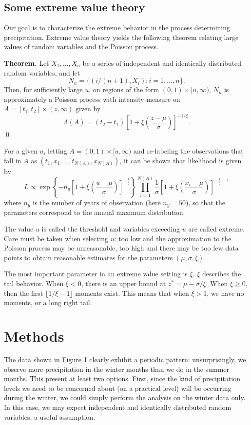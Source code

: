 \documentclass[12pt]{article}
\begin{document}
\subsection*{Some extreme value theory}

\noindent Our goal is to characterize the extreme behavior in the process determining precipitation. Extreme value theory yields the following theorem relating large values of random variables and the Poisson process.
\bigskip

\noindent \textbf{Theorem.} Let $X_1,\ldots,X_n$ be a series of independent and identically distributed random variables, and let
\[ N_n = \{(i/(n+1), X_i):i=1,\ldots,n\}. \]
\noindent Then, for sufficiently large $u$, on regions of the form $(0,1)\times[u,\infty)$, $N_n$ is approximately a Poisson process with intensity measure on $A=[t_1,t_2]\times(z,\infty)$ given by
\[ \Lambda(A) = (t_2-t_1)\left[1+\xi\left(\frac{z-\mu}{\sigma}\right)\right]^{-1/\xi}. \]
\qed
\bigskip

\noindent For a given $u$, letting $A=(0,1)\times[u,\infty)$ and re-labeling the observations that fall in $A$ as $(t_1,x_1,\ldots,t_{N(A)},x_{N(A)})$, it can be shown that likelihood is given by
\[ L \propto \exp\left\{-n_y\left[1+\xi\left(\frac{u-\mu}{\sigma}\right)\right]^{-\frac{1}{\xi}}\right\}\prod_{i=1}^{N(A)}\frac{1}{\sigma}\left[1+\xi\left(\frac{x_i-\mu}{\sigma}\right)\right]^{-\frac{1}{\xi}-1} \]
\noindent where $n_y$ is the number of years of observation (here $n_y=50$), so that the parameters correspond to the annual maximum distribution.
\bigskip

\noindent The value $u$ is called the threshold and variables exceeding $u$ are called extreme. Care must be taken when selecting $u$: too low and the approximation to the Poisson process may be unreasonable, too high and there may be too few data points to obtain reasonable estimates for the parameters $(\mu, \sigma, \xi)$.
\bigskip

\noindent The most important parameter in an extreme value setting is $\xi$. $\xi$ describes the tail behavior. When $\xi<0$, there is an upper bound at $z^*=\mu-\sigma/\xi$. When $\xi\geq 0$, then the first $\lfloor{1/\xi-1}\rfloor$ moments exist. This means that when $\xi>1$, we have no moments, or a long right tail.

\section*{Methods}

\noindent The data shown in Figure 1 clearly exhibit a periodic pattern: unsurprisingly, we observe more precipitation in the winter months than we do in the summer months. This present at least two options. First, since the kind of precipitation levels we need to be concerned about (on a practical level) will be occurring during the winter, we could simply perform the analysis on the winter data only. In this case, we may expect independent and identically distributed random variables, a useful assumption.
\bigskip
\end{document}
